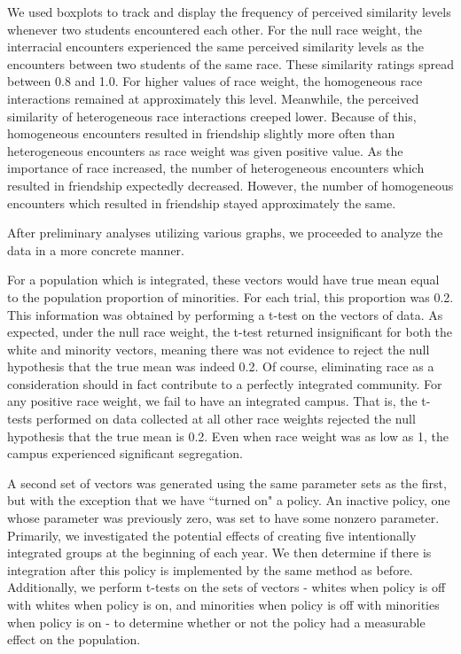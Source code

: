 We used boxplots to track and display the frequency of perceived similarity levels whenever two students encountered each 
other. For the null race weight, the interracial encounters experienced the same perceived similarity levels as the 
encounters between two students of the same race. These similarity ratings spread between 0.8 and 1.0. For higher values of 
race weight, the homogeneous race interactions remained at approximately this level. Meanwhile, the perceived similarity of 
heterogeneous race interactions creeped lower. Because of this, homogeneous encounters resulted in friendship slightly more 
often than heterogeneous encounters as race weight was given positive value. As the importance of race increased, the number 
of heterogeneous encounters which resulted in friendship expectedly decreased. However, the number of homogeneous encounters 
which resulted in friendship stayed approximately the same.

After preliminary analyses utilizing various graphs, we proceeded to analyze the data in a more concrete manner.

For a population which is integrated, these vectors would have true mean equal to the population proportion of minorities.
For each trial, this proportion was 0.2. This information was obtained by performing a t-test on the vectors of data. As 
expected, under the null race weight, the t-test returned insignificant for both the white and minority vectors, meaning 
there was not evidence to reject the null hypothesis that the true mean was indeed 0.2. Of course, eliminating race as a 
consideration should in fact contribute to a perfectly integrated community. For any positive race weight, we fail to have 
an integrated campus. That is, the t-tests performed on data collected at all other race weights rejected the null hypothesis 
that the true mean is 0.2. Even when race weight was as low as 1, the campus experienced significant segregation.

A second set of vectors was generated using the same parameter sets as the first, but with the exception that we have ``turned 
on" a policy. An inactive policy, one whose parameter was previously zero, was set to have some nonzero parameter. Primarily, 
we investigated the potential effects of creating five intentionally integrated groups at the beginning of each year. We then 
determine if there is integration after this policy is implemented by the same method as before. Additionally, we perform 
t-tests on the sets of vectors - whites when policy is off with whites when policy is on, and minorities when policy is off 
with minorities when policy is on - to determine whether or not the policy had a measurable effect on the population. 

